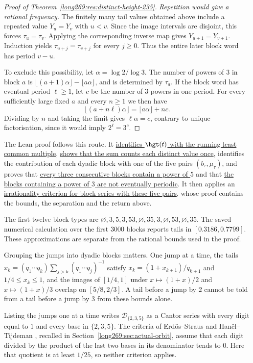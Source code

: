 \begin{proof}[Proof of Theorem~\ref{long269:res:distinct-height-235}]
\medskip
\emph{Repetition would give a rational frequency.}
The finitely many tail values obtained above include a repeated value
$Y_u=Y_v$ with $u<v$. Since the image intervals are disjoint, this
forces $\tau_u=\tau_v$. Applying the corresponding inverse map gives
$Y_{u+1}=Y_{v+1}$. Induction yields
$\tau_{u+j}=\tau_{v+j}$ for every $j\ge0$. Thus the entire later block
word has period $v-u$.

To exclude this possibility, let $\alpha=\log2/\log3$. The number of powers
of $3$ in block $a$ is
$\lfloor(a+1)\alpha\rfloor-\lfloor a\alpha\rfloor$, and is determined by
$\tau_a$. If the block word has eventual period $\ell\ge1$, let $c$ be the
number of $3$-powers in one period. For every sufficiently large fixed $a$
and every $n\ge1$ we then have
\[
 \lfloor(a+n\ell)\alpha\rfloor=\lfloor a\alpha\rfloor+nc.
\]
Dividing by $n$ and taking the limit gives $\ell\alpha=c$, contrary to
unique factorisation, since it would imply $2^\ell=3^c$.
\end{proof}
The Lean proof follows this route.  It
\href{\distinctheightlean\#L60}{identifies $\hgt(t)$ with the running least
common multiple}, \href{\distinctheightlean\#L698}{shows that the sum counts
each distinct value once}, identifies the contribution of each dyadic block
with one of the five pairs $(b_\tau,\mu_\tau)$, and proves that
\href{\distinctheightlean\#L437}{every three consecutive blocks contain a power
of $5$} and that \href{\distinctheightlean\#L494}{the blocks containing a power
of $3$ are not eventually periodic}.  It then applies an
\href{\distinctheightblocklean\#L340}{irrationality criterion for block series
with these five pairs}, whose proof contains the bounds, the separation and
the return above.

The first twelve block types are
$\varnothing,3,5,3,53,\varnothing,35,3,\varnothing,53,\varnothing,35$.
The saved numerical calculation over the first $3000$ blocks reports tails
in $[0.3186,0.7799]$. These approximations are separate from the rational
bounds used in the proof.

Grouping the jumps into dyadic blocks matters.  One jump at a time, the
tails $x_k=(q_1\cdots q_k)\sum_{j>k}(q_1\cdots q_j)^{-1}$
satisfy $x_{k}=(1+x_{k+1})/q_{k+1}$ and $1/4\le x_k\le1$, and the images of
$[1/4,1]$ under $x\mapsto(1+x)/2$ and $x\mapsto(1+x)/3$ overlap on
$[5/8,2/3]$.  A tail before a jump by $2$ cannot be told from a tail before a
jump by $3$ from these bounds alone.

Listing the jumps one at a time writes $\mathcal D_{\{2,3,5\}}$ as a
Cantor series with every digit equal to $1$ and every base in $\{2,3,5\}$.  The criteria of
Erd\H{o}s--Straus \cite[Theorem~2.1]{erdosstraus1974} and
Han\v{c}l--Tijdeman \cite[Theorem~3.1]{hancltijdeman2004}, recalled in
Section~\ref{long269:sec:actual-orbit}, assume that each digit divided by
the product of the last two bases in its denominator tends to $0$.  Here that
quotient is at least $1/25$, so neither criterion applies.

